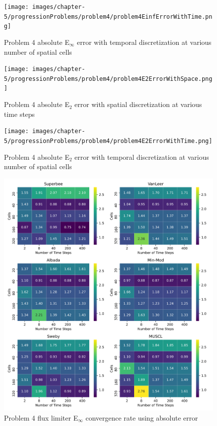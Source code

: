 \clearpage

\begin{figure}[p]
    \centering
    \texttt{[image: images/chapter-5/progressionProblems/problem4/problem4EinfErrorWithTime.png]}
    \caption{Problem 4 absolute E${}_{\infty}$ error with temporal discretization at various number of spatial cells}
    \label{fig:problem4_linferror_time_results}
\end{figure}


\begin{figure}[p]
    \centering
    \texttt{[image: images/chapter-5/progressionProblems/problem4/problem4E2ErrorWithSpace.png]}
    \caption{Problem 4 absolute E${}_{2}$ error with spatial discretization at various time steps }
    \label{fig:problem4_l2error_spatial_results}
\end{figure}

\clearpage

\begin{figure}[p]
    \centering
    \texttt{[image: images/chapter-5/progressionProblems/problem4/problem4E2ErrorWithTime.png]}
    \caption{Problem 4 absolute E${}_{2}$ error with temporal discretization at various number of spatial cells}
    \label{fig:problem4_l2error_time_results}
\end{figure}

\clearpage

\begin{figure}[p]
    \centering
    \includegraphics[width=6in]{images/chapter-5/progressionProblems/problem4/problem4EinftyFluxLimiterConvergenceRate.png}
    \caption{Problem 4 flux limiter E${}_{\infty}$ convergence rate using absolute error}
    \label{fig:problem4_linferror_fluxlimiter_convergence_rate}
\end{figure}


